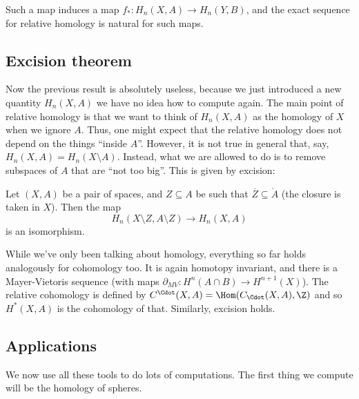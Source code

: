 \documentclass[a4paper]{article}
\theoremstyle{definition}
\begin{document}
Such a map induces a map $f_*: H_n(X, A) \to H_n(Y, B)$, and the exact sequence for relative homology is natural for such maps.

\subsection{Excision theorem}
Now the previous result is absolutely useless, because we just introduced a new quantity $H_n(X, A)$ we have no idea how to compute again. The main point of relative homology is that we want to think of $H_n(X, A)$ as the homology of $X$ when we ignore $A$. Thus, one might expect that the relative homology does not depend on the things ``inside $A$''. However, it is not true in general that, say, $H_n(X, A) = H_n(X \setminus A)$. Instead, what we are allowed to do is to remove subspaces of $A$ that are ``not too big''. This is given by excision:

\begin{thm}
  Let $(X, A)$ be a pair of spaces, and $Z \subseteq A$ be such that $\overline{Z} \subseteq \mathring{A}$ (the closure is taken in $X$). Then the map
  \[
    H_n(X \setminus Z, A \setminus Z) \to H_n(X, A)
  \]
  is an isomorphism.
\end{thm}
\begin{center}
\end{center}
While we've only been talking about homology, everything so far holds analogously for cohomology too. It is again homotopy invariant, and there is a Mayer-Vietoris sequence (with maps $\partial_{MV}: H^n(A \cap B) \to H^{n + 1}(X)$). The relative cohomology is defined by $C^{\Cdot}(X, A) = \Hom(C_{\Cdot}(X, A), \Z)$ and so $H^*(X, A)$ is the cohomology of that. Similarly, excision holds.

\subsection{Applications}
We now use all these tools to do lots of computations. The first thing we compute will be the homology of spheres.
\end{document}
